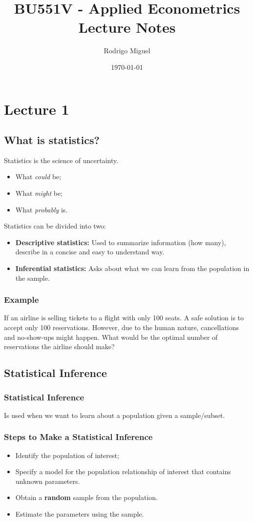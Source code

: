 \documentclass[11pt,a4paper]{report}
\title{BU551V - Applied Econometrics \\ Lecture Notes}
\author{Rodrigo Miguel}
\date{\today}
\begin{document}
\maketitle
\tableofcontents

\chapter{Lecture 1}
\section{What is statistics?}
Statistics is the science of uncertainty.
\begin{itemize}
    \item What \textit{could} be;
    \item What \textit{might} be;
    \item What \textit{probably} is.
\end{itemize}
Statistics can be divided into two:
\begin{itemize}
    \item \textbf{Descriptive statistics:} Used to summarize information (how many), describe in a concise and easy to understand way.
    \item \textbf{Inferential statistics:} Asks about what we can learn from the population in the sample.
\end{itemize}
\subsection{Example}
If an airline is selling tickets to a flight with only 100 seats. A safe solution is to accept only 100 reservations. However, due to the human nature, cancellations and no-show-ups might happen. What would be the optimal number of reservations the airline should make?

\section{Statistical Inference}
\subsection{Statistical Inference}
Is used when we want to learn about a population given a sample/subset.
\subsection{Steps to Make a Statistical Inference}
\begin{itemize}
    \item Identify the population of interest;
    \item Specify a model for the population relationship of interest that contains unknown parameters.
    \item Obtain a \textbf{random} sample from the population.
    \item Estimate the parameters using the sample.
\end{itemize}
\end{document}
